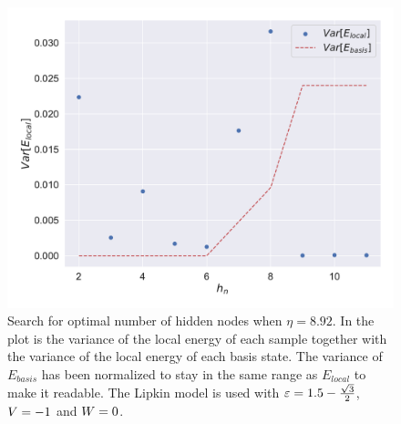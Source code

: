 \begin{figure}[H]
  \begin{center}
    \includegraphics[width=\optgridwidhtratio\textwidth]{Figures/Plots/OPt/Lipkin/[2][hidden_n][e=500][2-11].pdf}
  \end{center}
  \caption{Search for optimal number of hidden nodes when $\eta = 8.92$. In the plot is the variance of the local energy of each sample together with the variance of the local energy of each basis state. The variance of $E_{basis}$ has been normalized to stay in the same range as $E_{local}$ to make it readable. The Lipkin model is used with $\varepsilon = 1.5 - \frac{\sqrt{3}}{2}$, $V = -1$ and $W = 0$.}\label{fig:hn_depth1}
\end{figure}


